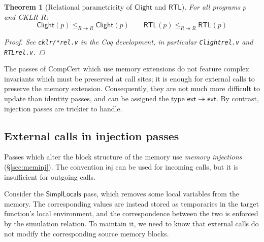 \documentclass[11pt,oneside,draft]{book}
\newtheorem{theorem}{Theorem}[chapter]
\theoremstyle{definition}
\newcommand{\kw}[1]{\ensuremath{ \mathsf{#1} }}
\begin{document}
\begin{theorem}[Relational parametricity of $\kw{Clight}$ and $\kw{RTL}$] %
\label{thm:param}
For all programs $p$ and CKLR $R$:
\[
      \kw{Clight}(p)
        \le_{R \twoheadrightarrow R}
      \kw{Clight}(p)
      \qquad
      \kw{RTL}(p)
        \le_{R \twoheadrightarrow R}
      \kw{RTL}(p)
\]
\begin{proof}
See \texttt{cklr/*rel.v} in the Coq development,
in particular \texttt{Clightrel.v} and \texttt{RTLrel.v}.
\end{proof}
\end{theorem}

The passes of CompCert which use memory extensions
do not feature complex invariants
which must be preserved at call sites;
it is enough for external calls to preserve
the memory extension.
Consequently,
they are not much more difficult to update
than identity passes,
and can be assigned the type $\kw{ext} \twoheadrightarrow \kw{ext}$.
By contrast,
injection passes are trickier to handle.


\subsection{External calls in injection passes} \label{sec:injp} %

Passes which alter the block structure of the memory
use \emph{memory injections} (\S\ref{sec:meminj}).
The convention \kw{inj} can be used for incoming calls,
but it is insufficient for outgoing calls.

Consider the \kw{SimplLocals} pass,
which removes some local variables %
from the memory.
The corresponding values are instead stored
as temporaries in the target function's local environment,
and the correspondence between the two
is enforced by the simulation relation.
To maintain it,
we need to know that
external calls do not modify
the corresponding source memory blocks.
\end{document}
